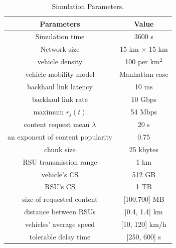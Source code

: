 \documentclass{ieeeaccess}
\begin{document}
\begin{table} %
    \caption{Simulation Parameters.}
    \begin{tabular}{cc}
        \hline
        \textbf{Parameters} & \textbf{Value} \\
        \hline
        Simulation time & 3600 s\\
        Network size & 15 km $\times$ 15 km\\
        vehicle density & 100 per {km}$^{2}$\\
        vehicle mobility model & Manhattan case \\
        
        backhaul link latency & 10 ms\\
        backhaul link rate & 10 Gbps\\
        maximum $r_{j}(t)$ & 54 Mbps\\
        
        content request mean $\lambda$ & 20 s\\
        an exponent of content popularity & 0.75\\
        chunk size & 25 kbytes\\
        
        RSU transmission range & 1 km\\
        
        vehicle's CS & 512 GB\\
        RSU's CS & 1 TB\\

        size of requested content & [100,700] MB \\
        distance between RSUs & [0.4, 1.4] km\\
        vehicles' average speed & [10, 120] km/h\\
        tolerable delay time & [250, 600] s\\
        \hline
    \end{tabular}
    \label{table1}
\end{table}
\end{document}
